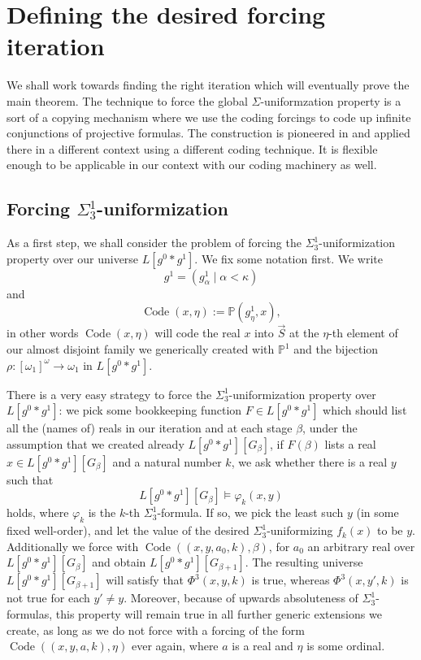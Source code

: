 \documentclass[a4paper,11pt]{article}
\newcommand{\forceP}{\mathbb{P}}
\begin{document}
\section{Defining the desired forcing iteration}

We shall work towards finding the right iteration which will eventually prove the main theorem. The technique to force the global $\Sigma$-uniformzation property is a sort of a copying mechanism where we use the coding forcings to code up infinite conjunctions of projective formulas. The construction is pioneered in \cite{BPFA and Global Uniformization} and applied there in a different context using a different coding technique. It is flexible enough to be applicable in our context with our coding machinery as well.

\subsection{Forcing $\Sigma^1_3$-uniformization}
As a first step, we shall consider the problem of forcing the $\Sigma^1_3$-uniformization property over our universe $L[g^0 \ast g^1]$. We fix some notation first. We write 
\[g^1= (g^1_{\alpha} \mid \alpha < \kappa ) \]
and 
\[ \operatorname{Code} (x,\eta) := \forceP( g^1_{\eta}, x), \]
in other words $\operatorname{Code} (x,\eta)$ will code the real $x$ into $\vec{S}$ at the $\eta$-th element of our almost disjoint family we generically created with $\forceP^1$ and the bijection $\rho: [\omega_1]^{\omega} \rightarrow \omega_1$ in $L[g^0 \ast g^1]$.


There is a very easy strategy to force the $\Sigma^1_3$-uniformization property over $L[g^0 \ast g^1]$: we pick some bookkeeping function $F \in L[g^0 \ast g^1]$ which should list all the (names of) reals in our iteration and at each stage $\beta$, under the assumption that we created already $L[g^0 \ast g^1][G_{\beta}]$, if $F(\beta)$ lists a real $x\in L[g^0 \ast g^1][G_{\beta}]$ and a natural number $k$, we ask whether there is a real $y$ such that
\[ L[g^0 \ast g^1][G_{\beta}] \models \varphi_k (x,y) \]
holds, where $\varphi_k$ is the $k$-th $\Sigma^1_3$-formula. If so, we pick the least such $y$ (in some fixed well-order), and let the value of the desired $\Sigma^1_3$-uniformizing $f_k(x)$ to be $y$. Additionally we force with $\operatorname{Code} ((x,y,a_0,k), \beta)$, for $a_0$ an arbitrary real over $L[g^0 \ast g^1][G_{\beta}]$ and obtain $L[g^0 \ast g^1][G_{\beta+1}]$. 
The resulting universe $L[g^0 \ast g^1][G_{\beta+1}]$ will satisfy that $\Phi^3(x,y,k)$ is true, whereas $\Phi^3(x,y',k)$ is not true for each $y' \ne y$. Moreover, because of upwards absoluteness of $\Sigma^1_3$-formulas, this property will remain true in all further generic extensions we create, as long as we do not force with a forcing of the form $\operatorname{Code} ((x,y,a,k), \eta)$ ever again, where $a$ is a real and $\eta$ is some ordinal.
\end{document}
